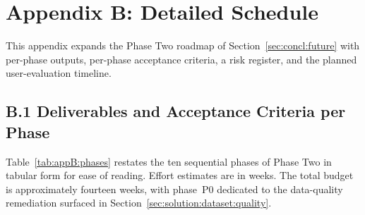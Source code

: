 \chapter*{Appendix B: Detailed Schedule}
\label{appendix:schedule}

This appendix expands the Phase Two roadmap of Section~\ref{sec:concl:future} with per-phase outputs, per-phase acceptance criteria, a risk register, and the planned user-evaluation timeline.

\section*{B.1 Deliverables and Acceptance Criteria per Phase}

Table~\ref{tab:appB:phases} restates the ten sequential phases of Phase Two in tabular form for ease of reading. Effort estimates are in weeks. The total budget is approximately fourteen weeks, with phase~P0 dedicated to the data-quality remediation surfaced in Section~\ref{sec:solution:dataset:quality}.

